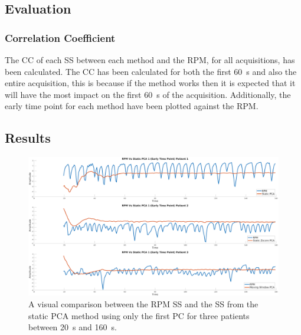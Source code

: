             \subsection{Evaluation} \label{sec:pca_data_driven_surrogate_signal_extraction_methods_for_dynamic_pet_methods_evaluation}
                \subsubsection{Correlation Coefficient} \label{sec:pca_data_driven_surrogate_signal_extraction_methods_for_dynamic_pet_methods_cross_correlation}
                    The \gls{CC} of each \gls{SS} between each method and the \gls{RPM}, for all acquisitions, has been calculated. The \gls{CC} has been calculated for both the first \SI{60}{\second} and also the entire acquisition, this is because if the method works then it is expected that it will have the most impact on the first \SI{60}{\second} of the acquisition. Additionally, the early time point  for each method have been plotted against the \gls{RPM}.
            
        \subsection{Results} \label{sec:pca_data_driven_surrogate_signal_extraction_methods_for_dynamic_pet_results}
            \begin{figure}
                \centering
                
                \includegraphics[width=1.0\linewidth]{figures/data_driven_surrogate_signal_extraction_results_1_vanilla_surrogate_signal.png}
                
                \captionsetup{singlelinecheck=false, justification=centering}
                \caption{A visual comparison between the \gls{RPM} \gls{SS} and the \gls{SS} from the static \gls{PCA} method using only the first \gls{PC} for three patients between \SI{20}{\second} and \SI{160}{\second}.}
                \label{fig:pca_data_driven_surrogate_signal_extraction_methods_for_dynamic_pet_results_vanilla_surrogate_signal}
            \end{figure}
            
